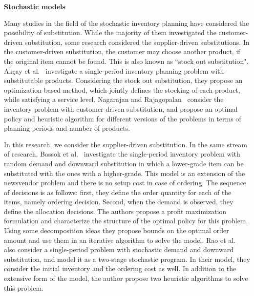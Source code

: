 \documentclass[11pt]{article}
\begin{document}
\textbf{Stochastic models}

Many studies in the field of the stochastic inventory planning have considered the possibility of substitution. While the majority of them investigated the customer-driven substitution, some research considered the supplier-driven substitutions.
In the customer-driven substitution, the customer may choose another product, if the original item cannot be found. This is also known as ``stock out substitution". Akçay et al.~\cite{akccaycategory} investigate a single-period inventory planning problem with substitutable products. Considering the stock out  substitution, they propose an optimization based method, which jointly defines the stocking of each product, while satisfying a service level. 
Nagarajan and Rajagopalan~\cite{nagarajan2008inventory} consider the inventory problem with customer-driven substitution, and propose an optimal policy and heuristic algorithm for different versions of the problems in terms of planning periods and number of products.

In this research, we consider the supplier-driven substitution. In the same stream of research, Bassok et al.~\cite{bassok1999single} investigate the single-period inventory problem with random demand and downward substitution in which a lower-grade item can be substituted with the ones with a higher-grade. This model is an extension of the newsvendor problem and there is no setup cost in case of ordering. The sequence of decisions is as follows: first, they define the order quantity for each of the items, namely ordering decision. Second, when the demand is observed, they define the allocation decisions. The authors propose a profit maximization formulation and characterize the structure of the optimal policy for this problem. Using some decomposition ideas they propose bounds on the optimal order amount and use them in an iterative algorithm to solve the model.  Rao et al.~\cite{rao2004multi} also consider a single-period problem with stochastic demand and downward substitution, and model it as a two-stage stochastic program. In their model, they consider the initial inventory and the ordering cost as well. In addition to the extensive form of the model, the author propose two heuristic algorithms to solve this problem.
\end{document}
